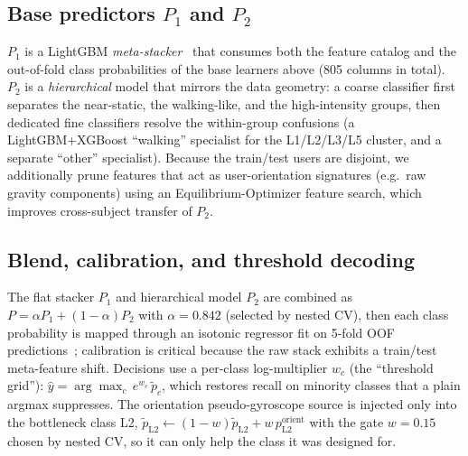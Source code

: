 \documentclass[conference]{IEEEtran}
\begin{document}
\subsection{Base predictors $P_1$ and $P_2$}
$P_1$ is a LightGBM \emph{meta-stacker}~\cite{ke2017lightgbm} that consumes both the feature catalog and the
out-of-fold class probabilities of the base learners above (805 columns in total). $P_2$ is a
\emph{hierarchical} model that mirrors the data geometry: a coarse classifier first separates the
near-static, the walking-like, and the high-intensity groups, then dedicated fine classifiers resolve the
within-group confusions (a LightGBM+XGBoost ``walking'' specialist for the L1/L2/L3/L5 cluster, and a
separate ``other'' specialist). Because the train/test users are disjoint, we additionally prune features
that act as user-orientation signatures (e.g.\ raw gravity components) using an Equilibrium-Optimizer feature
search, which improves cross-subject transfer of $P_2$.

\subsection{Blend, calibration, and threshold decoding}
The flat stacker $P_1$ and hierarchical model $P_2$ are combined as $P=\alpha P_1+(1-\alpha)P_2$ with
$\alpha=0.842$ (selected by nested CV), then each class probability is mapped through an isotonic regressor
fit on 5-fold OOF predictions~\cite{zadrozny2002transforming}; calibration is critical because the raw stack
exhibits a train/test meta-feature shift. Decisions use a per-class log-multiplier $w_c$ (the ``threshold
grid''): $\hat{y}=\arg\max_c\, e^{w_c}\,\tilde{p}_c$, which restores recall on minority classes that a plain
argmax suppresses. The orientation pseudo-gyroscope source is injected only into the bottleneck class L2,
$\tilde{p}_{\mathrm{L2}}\leftarrow(1-w)\tilde{p}_{\mathrm{L2}}+w\,p^{\mathrm{orient}}_{\mathrm{L2}}$ with the
gate $w=0.15$ chosen by nested CV, so it can only help the class it was designed for.
\end{document}
